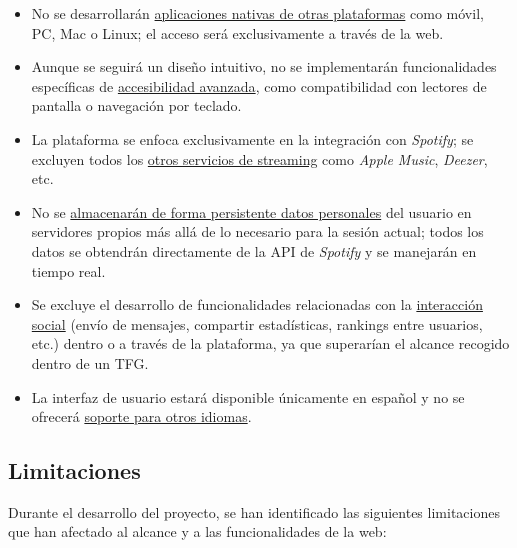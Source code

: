 \begin{itemize}
    \item No se desarrollarán \underline{aplicaciones nativas de otras plataformas} como móvil, PC, Mac o Linux; el acceso será exclusivamente a través de la web.

    \item Aunque se seguirá un diseño intuitivo, no se implementarán funcionalidades específicas de \underline{accesibilidad avanzada}, como compatibilidad con lectores de pantalla o navegación por teclado.

    \item La plataforma se enfoca exclusivamente en la integración con \textit{Spotify}; se excluyen todos los \underline{otros servicios de streaming} como \textit{Apple Music}, \textit{Deezer}, etc.

    \item No se \underline{almacenarán de forma persistente datos personales} del usuario en servidores propios más allá de lo necesario para la sesión actual; todos los datos se obtendrán directamente de la API de \textit{Spotify} y se manejarán en tiempo real.

    \item Se excluye el desarrollo de funcionalidades relacionadas con la \underline{interacción social} (envío de mensajes, compartir estadísticas, rankings entre usuarios, etc.) dentro o a través de la plataforma, ya que superarían el alcance recogido dentro de un TFG.

    \item La interfaz de usuario estará disponible únicamente en español y no se ofrecerá \underline{soporte para otros idiomas}.
\end{itemize}

\subsection{Limitaciones}

Durante el desarrollo del proyecto, se han identificado las siguientes limitaciones que han afectado al alcance y a las funcionalidades de la web:

